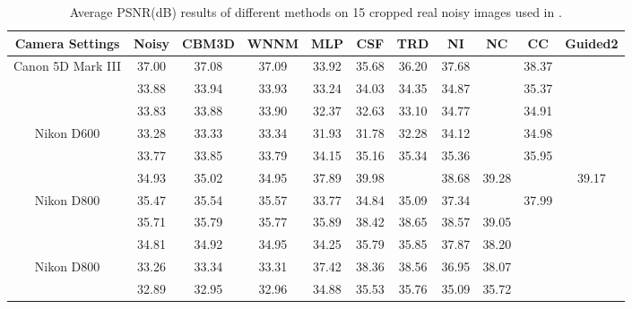 \documentclass[10pt,twocolumn,letterpaper]{article}
\begin{document}
\begin{table}\label{tab2}
\caption{Average PSNR(dB) results of different methods on 15 cropped real noisy images used in \cite{crosschannel2016}.}
\label{tab1}
\begin{center}
\renewcommand\arraystretch{1}
\begin{tabular}{|c||c|c|c|c|c|c|c|c|c|c|}
\hline
Camera Settings & \textbf{Noisy} &\textbf{CBM3D}&\textbf{WNNM}&\textbf{MLP}&\textbf{CSF}&\textbf{TRD}& \textbf{NI}& \textbf{NC}& \textbf{CC} &\textbf{Guided2} 
\\
\hline
\multirow{3}{*}{\small{Canon 5D Mark III}} 
& 37.00 & 37.08 & 37.09 & 33.92 & 35.68 & 36.20 & 37.68 & \color{blue}{38.76} & 38.37 & \color{red}{40.50}
\\ 
\cline{2-11} 
\multirow{3}{*}{ISO = 3200}   
& 33.88 & 33.94 & 33.93 & 33.24 & 34.03 & 34.35 & 34.87 & \color{blue}{35.69} & 35.37 & \color{red}{37.22}
\\ 
\cline{2-11}    
& 33.83 & 33.88 & 33.90 & 32.37 & 32.63 & 33.10 & 34.77 & \color{blue}{35.54} & 34.91 & \color{red}{37.13}  
\\
\hline
\multirow{3}{*}{Nikon D600} 
& 33.28 & 33.33 & 33.34 & 31.93 & 31.78 & 32.28 & 34.12 & \color{red}{35.57} & 34.98 & \color{blue}{35.34}
\\ 
\cline{2-11} 
\multirow{3}{*}{ISO = 3200}   
& 33.77 & 33.85 & 33.79 & 34.15 & 35.16 & 35.34 & 35.36 & \color{red}{36.70} & 35.95 & \color{blue}{36.69}
\\ 
\cline{2-11}    
& 34.93 & 35.02 & 34.95 & 37.89 & 39.98 & \color{blue}{40.51} & 38.68 & 39.28 & \color{red}{41.15} & 39.17
\\
\hline
\multirow{3}{*}{Nikon D800} 
& 35.47 & 35.54 & 35.57 & 33.77 & 34.84 & 35.09 & 37.34 & \color{blue}{38.01} & 37.99 & \color{red}{38.82}
\\ 
\cline{2-11} 
\multirow{3}{*}{ISO = 1600}   
& 35.71 & 35.79 & 35.77 & 35.89 & 38.42 & 38.65 & 38.57 & 39.05 & \color{blue}{40.36} & \color{red}{40.98}
\\ 
\cline{2-11}    
& 34.81 & 34.92 & 34.95 & 34.25 & 35.79 & 35.85 & 37.87 & 38.20 & \color{blue}{38.30} & \color{red}{38.90}
\\
\hline
\multirow{3}{*}{Nikon D800} 
& 33.26 & 33.34 & 33.31 & 37.42 & 38.36 & 38.56 & 36.95 & 38.07 & \color{red}{39.01} & \color{blue}{38.69}
\\ 
\cline{2-11} 
\multirow{3}{*}{ISO = 3200}   
& 32.89 & 32.95 & 32.96 & 34.88 & 35.53 & 35.76 & 35.09 & 35.72 & \color{blue}{36.75} & \color{red}{36.82}
\\ 

\end{tabular}
\end{center}
\end{table}
\end{document}
